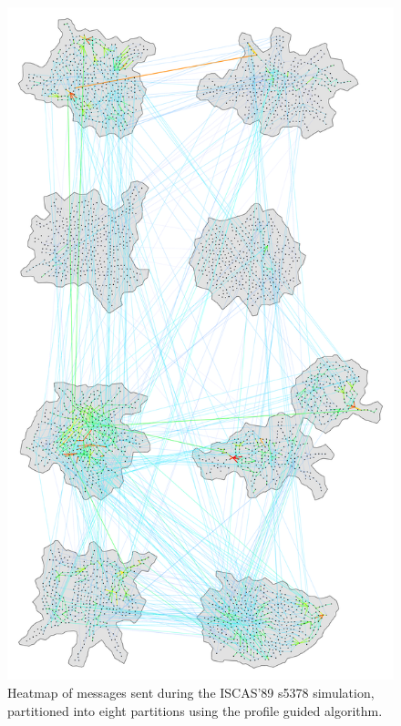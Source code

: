 \documentclass[11pt]{book}
\begin{document}
\begin{figure}
\centering
\includegraphics[width=\textwidth,height=0.9\textheight,keepaspectratio]{figs/s5378_8part}
\caption{Heatmap of messages sent during the ISCAS'89 s5378 simulation, partitioned into eight partitions using the profile guided algorithm.}
\end{figure}
\end{document}
